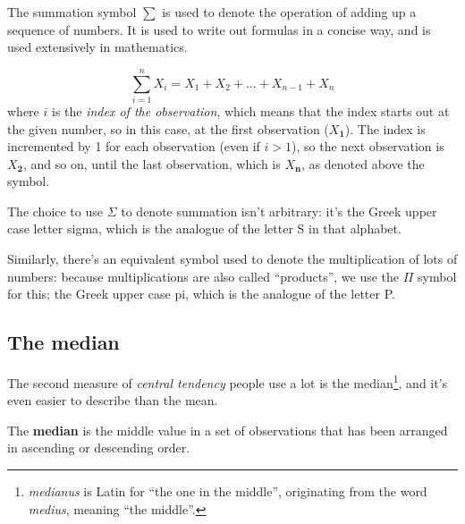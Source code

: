 \documentclass[
  11pt,
  a4paper,
  twoside,symmetric,openright]{book}
\theoremstyle{break}
\theoremstyle{break}
\begin{document}
\hypertarget{summation}{}
\begin{callout}

\begin{keepTogether}
The summation symbol \(\scriptstyle\sum\) is used to denote the operation of adding up a sequence of numbers. It is used to write out formulas in a concise way, and is used extensively in mathematics.

\[
\sum_{i=1}^n X_i = X_1 + X_2 + ... + X_{n-1} + X_n
\]
where \(i\) is the \emph{index of the observation}, which means that the index starts out at the given number, so in this case, at the first observation (\(X_\mathbf{1}\)). The index is incremented by 1 for each observation (even if \(i>1\)), so the next observation is \(X_\mathbf{2}\), and so on, until the last observation, which is \(X_\mathbf{n}\), as denoted above the symbol.

\end{keepTogether}

The choice to use \(\Sigma\) to denote summation isn't arbitrary: it's the Greek upper case letter sigma, which is the analogue of the letter S in that alphabet.

Similarly, there's an equivalent symbol used to denote the multiplication of lots of numbers: because multiplications are also called ``products'', we use the \(\Pi\) symbol for this; the Greek upper case pi, which is the analogue of the letter P.

\end{callout}

\hypertarget{median}{%
\subsection{The median}\label{median}}

The second measure of \emph{central tendency} people use a lot is the median\footnote{\emph{medianus} is Latin for ``the one in the middle'', originating from the word \emph{medius}, meaning ``the middle''.}, and it's even easier to describe than the mean.

\begin{definition}[Median]
\protect\hypertarget{def:defmedian}{}\label{def:defmedian}The \textbf{median} is the middle value in a set of observations that has been arranged in ascending or descending order.
\end{definition}
\end{document}
